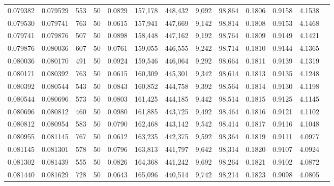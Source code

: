 \begin{tabular}{rrrrrrrrrrrrr}
0.079382 & 0.079529 &   553 &  50 &                                     0.0829 & 157,178 & 448,432 &   9,092 &  98,864 & 0.1806 & 0.9158 & 4.1538 \\
0.079530 & 0.079741 &   763 &  50 &                                     0.0615 & 157,941 & 447,669 &   9,142 &  98,814 & 0.1808 & 0.9153 & 4.1468 \\
0.079741 & 0.079876 &   507 &  50 &                                     0.0898 & 158,448 & 447,162 &   9,192 &  98,764 & 0.1809 & 0.9149 & 4.1421 \\
0.079876 & 0.080036 &   607 &  50 &                                     0.0761 & 159,055 & 446,555 &   9,242 &  98,714 & 0.1810 & 0.9144 & 4.1365 \\
0.080036 & 0.080170 &   491 &  50 &                                     0.0924 & 159,546 & 446,064 &   9,292 &  98,664 & 0.1811 & 0.9139 & 4.1319 \\
0.080171 & 0.080392 &   763 &  50 &                                     0.0615 & 160,309 & 445,301 &   9,342 &  98,614 & 0.1813 & 0.9135 & 4.1248 \\
0.080392 & 0.080544 &   543 &  50 &                                     0.0843 & 160,852 & 444,758 &   9,392 &  98,564 & 0.1814 & 0.9130 & 4.1198 \\
0.080544 & 0.080696 &   573 &  50 &                                     0.0803 & 161,425 & 444,185 &   9,442 &  98,514 & 0.1815 & 0.9125 & 4.1145 \\
0.080696 & 0.080812 &   460 &  50 &                                     0.0980 & 161,885 & 443,725 &   9,492 &  98,464 & 0.1816 & 0.9121 & 4.1102 \\
0.080812 & 0.080954 &   583 &  50 &                                     0.0790 & 162,468 & 443,142 &   9,542 &  98,414 & 0.1817 & 0.9116 & 4.1048 \\
0.080955 & 0.081145 &   767 &  50 &                                     0.0612 & 163,235 & 442,375 &   9,592 &  98,364 & 0.1819 & 0.9111 & 4.0977 \\
0.081145 & 0.081301 &   578 &  50 &                                     0.0796 & 163,813 & 441,797 &   9,642 &  98,314 & 0.1820 & 0.9107 & 4.0924 \\
0.081302 & 0.081439 &   555 &  50 &                                     0.0826 & 164,368 & 441,242 &   9,692 &  98,264 & 0.1821 & 0.9102 & 4.0872 \\
0.081440 & 0.081629 &   728 &  50 &                                     0.0643 & 165,096 & 440,514 &   9,742 &  98,214 & 0.1823 & 0.9098 & 4.0805 \\

\end{tabular}
